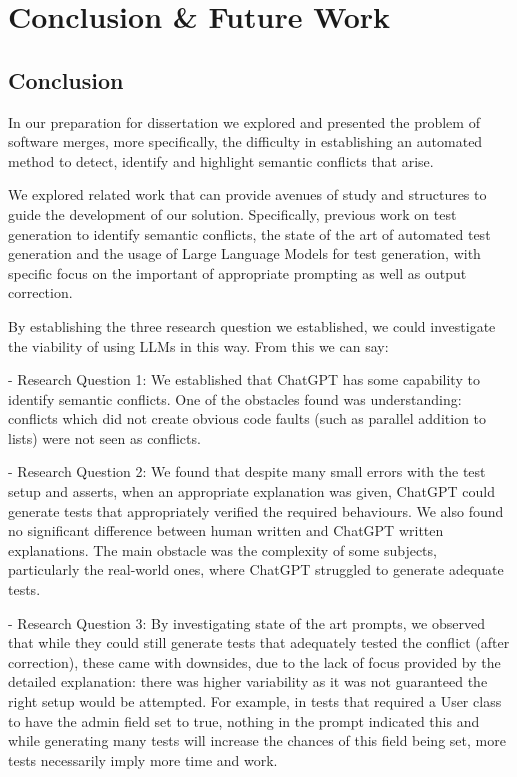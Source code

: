 \chapter{Conclusion \& Future Work}\label{chap:conclusion}

\section{Conclusion}

In our preparation for dissertation we explored and presented the problem of software merges, more specifically, the difficulty in establishing an automated method to detect, identify and highlight semantic conflicts that arise.

We explored related work that can provide avenues of study and structures to guide the development of our solution. Specifically, previous work on test generation to identify semantic conflicts, the state of the art of automated test generation and the usage of Large Language Models for test generation, with specific focus on the important of appropriate prompting as well as output correction.

By establishing the three research question we established, we could investigate the viability of using LLMs in this way. From this we can say:

- Research Question 1: We established that ChatGPT has some capability to identify semantic conflicts. One of the obstacles found was understanding:
conflicts which did not create obvious code faults (such as parallel addition to lists) were not seen as conflicts. 

- Research Question 2: We found that despite many small errors with the test setup and asserts, when an appropriate explanation was given, ChatGPT could generate
tests that appropriately verified the required behaviours. We also found no significant difference between human written and ChatGPT written explanations. The main obstacle
was the complexity of some subjects, particularly the real-world ones, where ChatGPT struggled to generate adequate tests.

- Research Question 3: By investigating state of the art prompts, we observed that while they could still generate tests that adequately tested the conflict (after correction),
these came with downsides, due to the lack of focus provided by the detailed explanation: there was higher variability as it was not guaranteed the right setup would be attempted.
For example, in tests that required a User class to have the admin field set to true, nothing in the prompt indicated this and while generating many tests will increase the chances
of this field being set, more tests necessarily imply more time and work.

